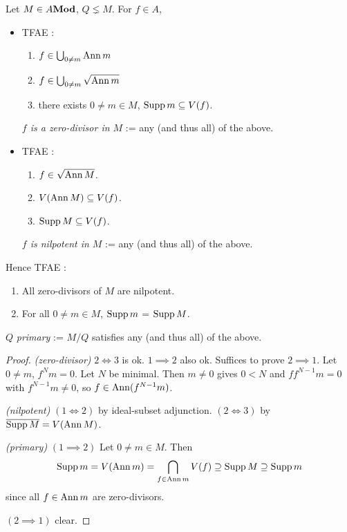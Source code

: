 \begin{prop}
  
  Let $M \in A\mathbf{Mod}$, $Q \lneq M$. 
  For $f \in A$, 
  \begin{itemize}
    \item TFAE : 
    \begin{enumerate}
      \item $f \in \bigcup_{0 \neq m} \operatorname{Ann} m$
      \item $f \in \bigcup_{0 \neq m} \sqrt{\operatorname{Ann} m}$
      \item there exists $0 \neq m \in M$, $\operatorname{Supp} m \subseteq V(f)$.
    \end{enumerate}
    
    \textit{$f$ is a zero-divisor in $M$}
    := any (and thus all) of the above.
    \item TFAE : 
    \begin{enumerate}
      \item $f \in \sqrt{\operatorname{Ann} M}$. 
      \item $V(\operatorname{Ann} M) \subseteq V(f)$.
      \item $\operatorname{Supp} M \subseteq V(f)$.
    \end{enumerate}
    
    \textit{$f$ is nilpotent in $M$}
    := any (and thus all) of the above.
  \end{itemize}
  Hence TFAE : 
  \begin{enumerate}
    \item All zero-divisors of $M$ are nilpotent. 
    \item For all $0 \neq m \in M$, $\operatorname{Supp} m$ = $\operatorname{Supp} M$. 
  \end{enumerate}
  $Q$ \textit{primary} := $M/Q$ satisfies any (and thus all)
  of the above. 
  
\end{prop}
\begin{proof}
  \textit{(zero-divisor)} $2 \iff 3$ is ok. 
  $1 \implies 2$ also ok. Suffices to prove $2 \implies 1$.
  Let $0 \neq m$, $f^N m = 0$. Let $N$ be minimal.
  Then $m \neq 0$ gives $0 < N$ and $f f^{N-1} m = 0$ with $f^{N-1} m \neq 0$,
  so $f \in \operatorname{Ann} (f^{N-1}m)$.

  \textit{(nilpotent)}
  $(1 \iff 2)$ by ideal-subset adjunction. 
  $(2 \iff 3)$ by $\overline{\operatorname{Supp} M} = V(\operatorname{Ann} M)$.

  \textit{(primary)}
  $(1 \implies 2)$
  Let $0 \neq m \in M$. Then
  \[ \operatorname{Supp} m = V(\operatorname{Ann} m) = \bigcap_{f \in \operatorname{Ann} m} V(f) 
  \supseteq \operatorname{Supp} M \supseteq \operatorname{Supp} m\]
  since all $f \in \operatorname{Ann} m$ are zero-divisors. 

  $(2 \implies 1)$ clear. 

\end{proof}

